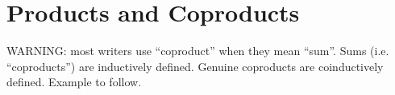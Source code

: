 \chapter{Products and Coproducts}

WARNING: most writers use ``coproduct'' when they mean ``sum''. Sums
(i.e. ``coproducts'') are inductively defined. Genuine coproducts are
coinductively defined.  Example to follow.

